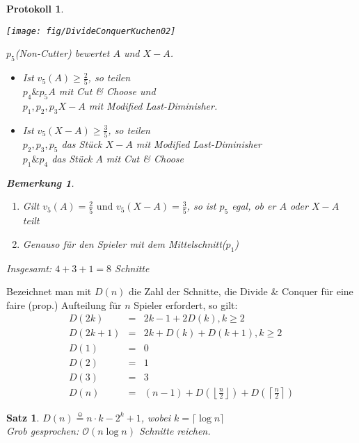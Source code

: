 \documentclass[a4paper,10pt]{scrartcl}
\newtheorem*{bemerkung*}{Bemerkung}
\newtheorem*{satz*}{Satz}
\newtheorem*{protokoll*}{Protokoll}
\begin{document}
\begin{protokoll*}
\begin{description}
               \begin{center}
                \texttt{[image: fig/DivideConquerKuchen02]}
               \end{center}
               $p_5$(Non-Cutter) bewertet $A$ und $X-A$.
               \begin{itemize}
                \item Ist $v_5(A)\geq\frac{2}{5}$, so teilen\\$p_4\&p_5 A$ mit Cut \& Choose und \\
                      $p_1,p_2,p_3 X-A$ mit Modified Last-Diminisher.
                \item Ist $v_5(X-A)\geq\frac{3}{5}$, so teilen\\$p_2,p_3,p_5$ das Stück $X-A$ mit Modified Last-Diminisher\\
                      $p_1\&p_4$ das Stück $A$ mit Cut \& Choose 
               \end{itemize}
               \begin{bemerkung*}
                \begin{enumerate}
                 \item Gilt $v_5(A)=\frac{2}{5}\text{ und }v_5(X-A)=\frac{3}{5}$, so ist $p_5$ egal, ob er $A$ oder $X-A$ teilt
                 \item Genauso für den Spieler mit dem Mittelschnitt($p_1$)
                \end{enumerate}
               \end{bemerkung*}
               Insgesamt: $4+3+1=8$ Schnitte
 \end{description}
\end{protokoll*}

Bezeichnet man mit $D(n)$ die Zahl der Schnitte, die Divide \& Conquer für eine faire (prop.) Aufteilung für $n$ Spieler erfordert, so gilt:
\begin{eqnarray*}
 D(2k) &=& 2k-1+2D(k), k\geq2\\
 D(2k+1) &=& 2k+D(k)+D(k+1), k\geq2\\
 D(1) &=& 0\\
 D(2) &=& 1\\
 D(3) &=& 3 \\
 D(n) &=& (n-1)+D(\left\lfloor\frac{n}{2}\right\rfloor)+D(\left\lceil\frac{n}{2}\right\rceil)
\end{eqnarray*}
\begin{satz*}
 $D(n)\stackrel{\smiley}{=}n\cdot k-2^k+1$, wobei $k=\lceil\log n\rceil$\\
 Grob gesprochen: $\mathcal{O}(n\log n)$ Schnitte reichen.
\end{satz*}
\end{document}
